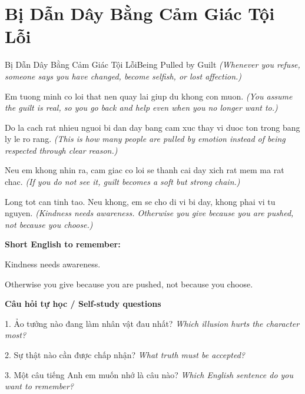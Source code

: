 \section{Bị Dẫn Dây Bằng Cảm Giác Tội Lỗi}
\begin{truyen}{Bị Dẫn Dây Bằng Cảm Giác Tội Lỗi}{Being Pulled by Guilt}
\textit{(Whenever you refuse, someone says you have changed, become selfish, or lost affection.)}

Em tuong minh co loi that nen quay lai giup du khong con muon.
\textit{(You assume the guilt is real, so you go back and help even when you no longer want to.)}

Do la cach rat nhieu nguoi bi dan day bang cam xuc thay vi duoc ton trong bang ly le ro rang.
\textit{(This is how many people are pulled by emotion instead of being respected through clear reason.)}

Neu em khong nhin ra, cam giac co loi se thanh cai day xich rat mem ma rat chac.
\textit{(If you do not see it, guilt becomes a soft but strong chain.)}

\end{truyen}

\begin{baihoc}
Long tot can tinh tao. Neu khong, em se cho di vi bi day, khong phai vi tu nguyen.
\textit{(Kindness needs awareness. Otherwise you give because you are pushed, not because you choose.)}
\end{baihoc}

\begin{ghinhoanh}
\textbf{Short English to remember:}

Kindness needs awareness.

Otherwise you give because you are pushed, not because you choose.

\end{ghinhoanh}

\begin{tuhocnhanh}
\textbf{Câu hỏi tự học / Self-study questions}

1. Ảo tưởng nào đang làm nhân vật đau nhất? \textit{Which illusion hurts the character most?}

2. Sự thật nào cần được chấp nhận? \textit{What truth must be accepted?}

3. Một câu tiếng Anh em muốn nhớ là câu nào? \textit{Which English sentence do you want to remember?}
\end{tuhocnhanh}
\ngancach

